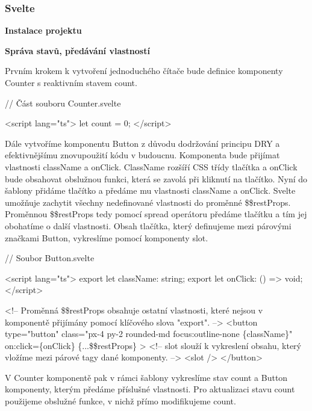 \subsubsection{Svelte}

\begin{flushleft}
  \textbf{Instalace projektu}
\end{flushleft}

\begin{flushleft}
  \textbf{Správa stavů, předávání vlastností}
\end{flushleft}

Prvním krokem k vytvoření jednoduchého čítače bude definice komponenty Counter s reaktivním stavem count.

\begin{prog}
// Část souboru Counter.svelte

<script lang="ts">
  let count = 0;
</script>
\end{prog}

Dále vytvoříme komponentu Button z důvodu dodržování principu DRY a efektivnějšímu znovupoužití kódu v budoucnu.
Komponenta bude přijímat vlastnosti className a onClick. ClassName rozšíří CSS třídy tlačítka a onClick bude obsahovat obslužnou funkci, která se zavolá při kliknutí na tlačítko.
Nyní do šablony přidáme tlačítko a předáme mu vlastnosti className a onClick.
Svelte umožňuje zachytit všechny nedefinované vlastnosti do proměnné \$\$restProps. Proměnnou \$\$restProps tedy pomocí spread operátoru předáme tlačítku a tím jej obohatíme o další vlastnosti. 
Obsah tlačítka, který definujeme mezi párovými značkami Button, vykreslíme pomocí komponenty slot.

\begin{prog}
// Soubor Button.svelte

<script lang="ts">
  export let className: string;
  export let onClick: () => void;
</script>

<!-- Proměnná \$\$restProps obsahuje ostatní vlastnosti, 
  které nejsou v komponentě přijímány pomocí klíčového slova "export". -->
<button
  type="button"
  class="px-4 py-2 rounded-md focus:outline-none \{className\}"
  on:click=\{onClick\}
  \{...\$\$restProps\}
>
  <!-- slot slouží k vykreslení obsahu, 
    který vložíme mezi párové tagy dané komponenty. -->
  <slot />
</button>
\end{prog}

V Counter komponentě pak v rámci šablony vykreslíme stav count a Button komponenty, kterým předáme příslušné vlastnosti. 
Pro aktualizaci stavu count použijeme obslužné funkce, v nichž přímo modifikujeme count.

